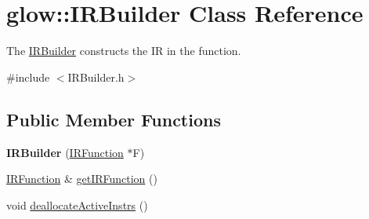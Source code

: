 \hypertarget{classglow_1_1_i_r_builder}{}\section{glow\+:\+:I\+R\+Builder Class Reference}
\label{classglow_1_1_i_r_builder}


The \hyperlink{classglow_1_1_i_r_builder}{I\+R\+Builder} constructs the IR in the function.  




{\ttfamily \#include $<$I\+R\+Builder.\+h$>$}

\subsection*{Public Member Functions}
\begin{DoxyCompactItemize}
\item 
\mbox{\label{classglow_1_1_i_r_builder_a6fafc3cead408c9df74381c906389f26}} 
{\bfseries I\+R\+Builder} (\hyperlink{classglow_1_1_i_r_function}{I\+R\+Function} $\ast$F)
\item 
\hyperlink{classglow_1_1_i_r_function}{I\+R\+Function} \& \hyperlink{classglow_1_1_i_r_builder_ad641d03c18c361fbf0f13ba844aa53d1}{get\+I\+R\+Function} ()
\item 
void \hyperlink{classglow_1_1_i_r_builder_a8b3101183daa13d185a6d89875a01294}{deallocate\+Active\+Instrs} ()
\end{DoxyCompactItemize}

